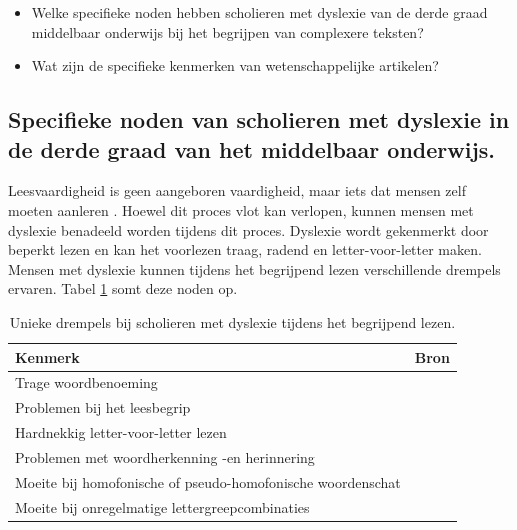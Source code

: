\begin{itemize}
	\item Welke specifieke noden hebben scholieren met dyslexie van de derde graad middelbaar onderwijs bij het begrijpen van complexere teksten?
	\item Wat zijn de specifieke kenmerken van wetenschappelijke artikelen?
\end{itemize}

\subsection{Specifieke noden van scholieren met dyslexie in de derde graad van het middelbaar onderwijs.}

Leesvaardigheid is geen aangeboren vaardigheid, maar iets dat mensen zelf moeten aanleren \autocite{Bonte2020, VanDerMeer2022}. Hoewel dit proces vlot kan verlopen, kunnen mensen met dyslexie benadeeld worden tijdens dit proces.  Dyslexie wordt gekenmerkt door beperkt lezen en kan het voorlezen traag, radend en letter-voor-letter maken. Mensen met dyslexie kunnen tijdens het begrijpend lezen verschillende drempels ervaren. Tabel \ref{table:dyslexia-hurdles} somt deze noden op.

\begin{center}
	\begin{table}[H]
	\begin{tabular}{ | m{9cm} | m{6cm} | } 
		\hline
		\textbf{Kenmerk} & \textbf{Bron} \\ 
		\hline
		Trage woordbenoeming &  \autocite{Bonte2020} \\
		\hline
		Problemen bij het leesbegrip & \autocite{Gala2016, Bonte2020} \\ 
		\hline
		Hardnekkig letter-voor-letter lezen & \autocite{Bonte2020, Zhang2021} \\ 
		\hline
		Problemen met woordherkenning -en herinnering & \autocite{Bonte2020} \\
		\hline
		Moeite bij homofonische of pseudo-homofonische woordenschat & \autocite{Zhang2021} \\
		\hline
		Moeite bij onregelmatige lettergreepcombinaties & \textcite{Gala2016} \\
		\hline
	\end{tabular}
	\caption{Unieke drempels bij scholieren met dyslexie tijdens het begrijpend lezen.}
	\label{table:dyslexia-hurdles}
	\end{table}
\end{center}

